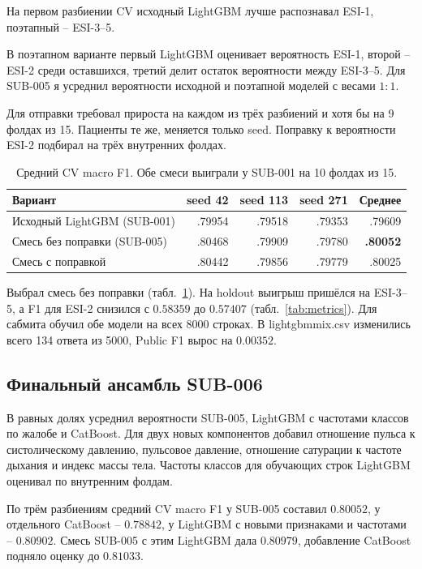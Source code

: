 \documentclass[11pt,a4paper,twocolumn]{article}
\newcommand{\f}[1]{{\ttfamily\def\_{\textunderscore\allowbreak}#1}}
\begin{document}
На первом разбиении CV исходный LightGBM лучше распознавал ESI-1, поэтапный – ESI-3--5.

В поэтапном варианте первый LightGBM оценивает вероятность ESI-1, второй – ESI-2 среди оставшихся, третий делит остаток вероятности между ESI-3--5. Для SUB-005 я усреднил вероятности исходной и поэтапной моделей с весами $1:1$.

Для отправки требовал прироста на каждом из трёх разбиений и хотя бы на 9 фолдах из 15. Пациенты те же, меняется только seed. Поправку к вероятности ESI-2 подбирал на трёх внутренних фолдах.

\begin{table}[!t]
    \centering
    \caption{Средний CV macro F1. Обе смеси выиграли у SUB-001 на 10 фолдах из 15.}\label{tab:blend}
    {\small \begin{tabular}{@{}lrrrr@{}}
    \toprule
    Вариант & seed 42 & seed 113 & seed 271 & Среднее\\
    \midrule
    Исходный LightGBM (SUB-001) & .79954 & .79518 & .79353 & .79609\\
    Смесь без поправки (SUB-005) & .80468 & .79909 & .79780 & \textbf{.80052}\\
    Смесь с поправкой & .80442 & .79856 & .79779 & .80025\\
    \bottomrule
    \end{tabular}}
\end{table}

Выбрал смесь без поправки (табл.~\ref{tab:blend}). На holdout выигрыш пришёлся на ESI-3--5, а F1 для ESI-2 снизился с $0.58359$ до $0.57407$ (табл.~\ref{tab:metrics}). Для сабмита обучил обе модели на всех 8000 строках. В \f{lightgbm\_mix.csv} изменились всего 134 ответа из 5000, Public F1 вырос на $0.00352$.

\subsection{Финальный ансамбль SUB-006}

В равных долях усреднил вероятности SUB-005, LightGBM с частотами классов по жалобе и CatBoost. Для двух новых компонентов добавил отношение пульса к систолическому давлению, пульсовое давление, отношение сатурации к частоте дыхания и индекс массы тела. Частоты классов для обучающих строк LightGBM оценивал по внутренним фолдам.

По трём разбиениям средний CV macro F1 у SUB-005 составил $0.80052$, у отдельного CatBoost – $0.78842$, у LightGBM с новыми признаками и частотами – $0.80902$. Смесь SUB-005 с этим LightGBM дала $0.80979$, добавление CatBoost подняло оценку до $0.81033$.
\end{document}
